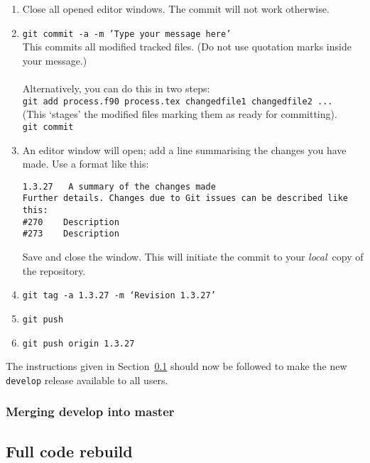 \documentclass[11pt,a4paper]{report}
\begin{document}
\begin{enumerate}
\item Close all opened editor windows. The commit will not work otherwise.

\item   \texttt{git commit -a -m 'Type your message here'} \\
  This commits all modified tracked files. (Do not use quotation marks inside your message.)\\
  \\
  Alternatively, you can do this in two steps:\\
  \texttt{git add process.f90 process.tex changedfile1 changedfile2 ...}  \\
  (This `stages' the modified files marking them as ready for committing).  \\
  \texttt{git commit}

\item An editor window will open; add a line summarising the changes you have made.  Use a format like this:
\begin{verbatim}
1.3.27   A summary of the changes made
Further details. Changes due to Git issues can be described like this:
#270    Description
#273    Description
\end{verbatim}
Save and close the window. This will initiate the commit to your \textit{local}\ copy of the repository.

\item \texttt{git tag -a 1.3.27 -m `Revision 1.3.27'}

\item \texttt{git push}

\item \texttt{git push origin 1.3.27}

\end{enumerate}

The instructions given in Section~\ref{sec:fullrebuild} should now be followed to make the new \texttt{develop} release available to all users.

\subsubsection{Merging develop into master}


\subsection{Full code rebuild}
\label{sec:fullrebuild}
\end{document}
